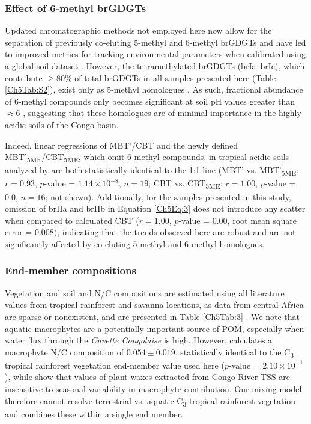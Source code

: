 \subsubsection{Effect of 6-methyl brGDGTs}\label{Ch5SD1}

Updated chromatographic methods not employed here now allow for the separation of previously co-eluting 5-methyl and 6-methyl brGDGTs and have led to improved metrics for tracking environmental parameters when calibrated using a global soil dataset \citep{DeJonge:2013cr,DeJonge:2014kw,Hopmans:2016fo}. However, the tetramethylated brGDGTs (brIa--brIc), which contribute $\geq 80$\% of total brGDGTs in all samples presented here (Table \ref{Ch5Tab:S2}), exist only as 5-methyl homologues \citep{DeJonge:2013cr}. As such, fractional abundance of 6-methyl compounds only becomes significant at soil pH values greater than $\approx 6$ \citep{DeJonge:2014kw}, suggesting that these homologues are of minimal importance in the highly acidic soils of the Congo basin. 

Indeed, linear regressions of MBT'/CBT and the newly defined MBT'\textsubscript{5ME}/CBT\textsubscript{5ME}, which omit 6-methyl compounds, in tropical acidic soils analyzed by \citet{DeJonge:2014kw} are both statistically identical to the 1:1 line (MBT' vs. MBT'\textsubscript{5ME}: $r = 0.93$, $p$-value = $1.14 \times 10^{-8}$, $n = 19$; CBT vs. CBT\textsubscript{5ME}: $r = 1.00$, $p$-value = $0.0$, $n = 16$; not shown). Additionally, for the samples presented in this study, omission of brIIa and brIIb in Equation \ref{Ch5Eq:3} does not introduce any scatter when compared to calculated CBT ($r = 1.00$, $p$-value = $0.00$, root mean square error = $0.008$), indicating that the trends observed here are robust and are not significantly affected by co-eluting 5-methyl and 6-methyl homologues.

\subsubsection{End-member compositions}\label{Ch5SD2}

Vegetation and soil  and N/C compositions are estimated using all literature values from tropical rainforest and savanna locations, as data from central Africa are sparse or nonexistent, and are presented in Table \ref{Ch5Tab:3} \citep{Thomas:1993us,Meyers:1994wca,Powers:2002ug,Powers:2002wg,Ross:2002vp,Cleveland:2007hka,Diefendorf:2010kb,Magill:2013ab}. We note that aquatic macrophytes are a potentially important source of POM, especially when water flux through the \textit{Cuvette Congolaise} is high. However, \citet{Duarte:1992tp} calculates a macrophyte N/C composition of $0.054 \pm 0.019$, statistically identical to the C\textsubscript{3} tropical rainforest vegetation end-member value used here ($p$-value = $2.10 \times 10^{-1}$), while \citet{Hemingway:2016bq} show that  values of plant waxes extracted from Congo River TSS are insensitive to seasonal variability in macrophyte contribution. Our mixing model therefore cannot resolve terrestrial vs. aquatic C\textsubscript{3} tropical rainforest vegetation and combines these within a single end member.

